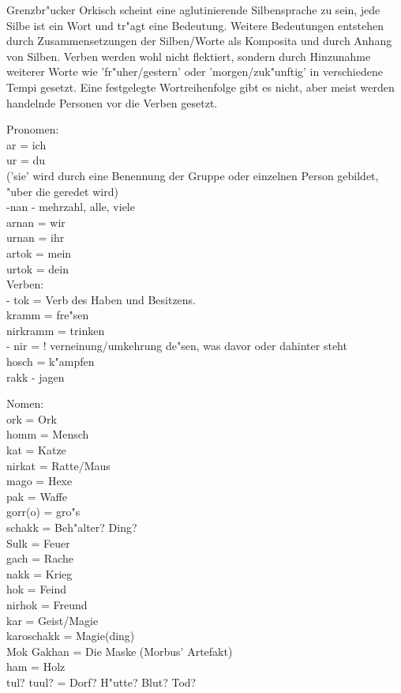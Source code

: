 \documentclass[a5paper,8pt]{book}
\begin{document}
Grenzbr"ucker Orkisch scheint eine aglutinierende Silbensprache zu sein, jede Silbe ist ein Wort und  tr"agt  eine Bedeutung. Weitere Bedeutungen entstehen durch Zusammensetzungen der Silben/Worte als Komposita und durch Anhang von Silben. Verben werden wohl nicht flektiert, sondern durch Hinzunahme weiterer Worte wie 'fr"uher/gestern' oder 'morgen/zuk"unftig' in verschiedene Tempi gesetzt. Eine festgelegte Wortreihenfolge gibt es nicht, aber meist werden handelnde Personen vor die Verben gesetzt. 

\newpage

Pronomen:\\

ar =  ich \\
ur = du \\

('sie' wird durch eine Benennung der Gruppe oder einzelnen Person gebildet, "uber die geredet wird)\\

-nan - mehrzahl, alle, viele \\
arnan = wir \\
urnan = ihr \\

artok = mein \\
urtok = dein \\
\newpage
Verben:\\

- tok = Verb des Haben und Besitzens.\\

kramm = fre"sen \\
nirkramm = trinken \\

- nir =  ! verneinung/umkehrung de"sen, was davor oder dahinter steht\\

hosch = k"ampfen \\
rakk - jagen \\

\newpage

Nomen: \\
ork = Ork\\ 
homm = Mensch\\
kat = Katze \\
nirkat = Ratte/Maus  \\
mago = Hexe \\
pak = Waffe\\
gorr(o) = gro"s \\
schakk = Beh"alter? Ding?\\
Sulk = Feuer \\
gach = Rache \\
nakk = Krieg \\
hok = Feind  \\
nirhok = Freund\\
kar = Geist/Magie\\ 
karoschakk = Magie(ding)\\
Mok Gakhan = Die Maske (Morbus' Artefakt)\\
ham = Holz \\
tul? tuul? = Dorf? H"utte? Blut? Tod? \\
\end{document}
